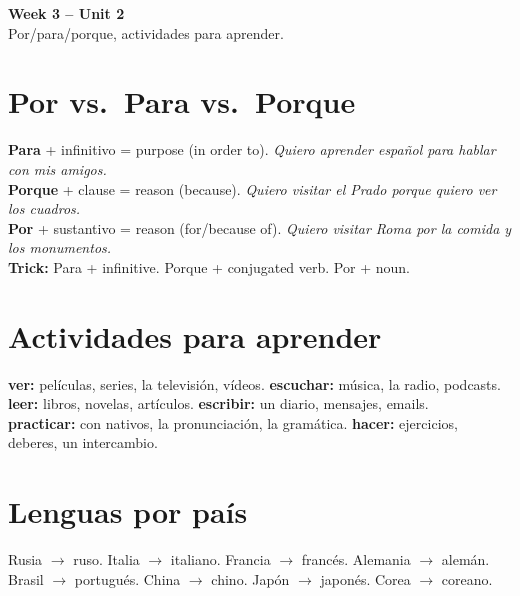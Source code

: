 \documentclass[10pt,a4paper]{article}
\begin{document}
\begin{center}
{\large\bfseries\color{w3purple} Week 3 -- Unit 2}\\[0.2em]
\footnotesize Por/para/porque, actividades para aprender.
\end{center}\vspace{0.5em}

\section*{\color{w3purple}Por vs.\ Para vs.\ Porque}
\textbf{Para} + infinitivo = purpose (in order to). \textit{Quiero aprender espa\~nol para hablar con mis amigos.} \\
\textbf{Porque} + clause = reason (because). \textit{Quiero visitar el Prado porque quiero ver los cuadros.} \\
\textbf{Por} + sustantivo = reason (for/because of). \textit{Quiero visitar Roma por la comida y los monumentos.} \\
\textbf{Trick:} Para + infinitive. Porque + conjugated verb. Por + noun.

\section*{\color{w3purple}Actividades para aprender}
\textbf{ver:} pel\'iculas, series, la televisi\'on, v\'ideos. \textbf{escuchar:} m\'usica, la radio, podcasts. \\
\textbf{leer:} libros, novelas, art\'iculos. \textbf{escribir:} un diario, mensajes, emails. \\
\textbf{practicar:} con nativos, la pronunciaci\'on, la gram\'atica. \textbf{hacer:} ejercicios, deberes, un intercambio.

\section*{\color{w3purple}Lenguas por pa\'is}
Rusia $\to$ ruso. Italia $\to$ italiano. Francia $\to$ franc\'es. Alemania $\to$ alem\'an. \\
Brasil $\to$ portugu\'es. China $\to$ chino. Jap\'on $\to$ japon\'es. Corea $\to$ coreano.
\end{document}
